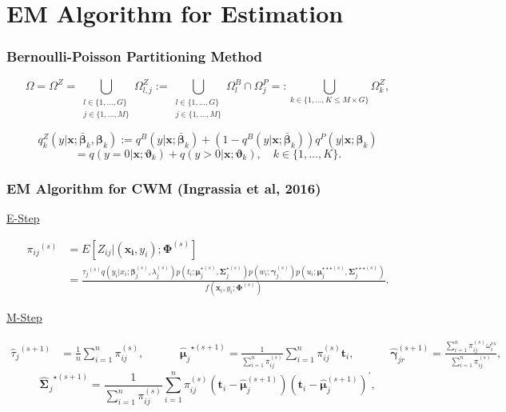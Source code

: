 \documentclass{beamer}
\begin{document}
\section{EM Algorithm for Estimation}
\begin{frame}
\frametitle{Bernoulli-Poisson Partitioning Method}
$$\Omega =  \Omega^Z = \bigcup_{ \substack {l \in \{1 ,\ldots, G \} \\ j \in \{1 ,\ldots, M \}}  } \Omega_{l,j}^Z := \bigcup_{\substack{ l \in \{1 ,\ldots, G \} \\ j \in \{1 ,\ldots, M \}  } }  \Omega_l^B \cap \Omega_j^P =: \bigcup_{k \in \{1 ,\ldots, K\leq M \times G \}} \Omega_k^Z, $$
\begin{small}
$$q^Z_{k}(y|\bm{x};  \bm{\bar{\beta}}_k,\bm{ \beta}_k)  := q^B(y|\bm{x}; \bm{\bar{\beta}}_k) +(1-  q^B(y|\bm{x}; \bm{\bar{\beta}}_k) ) q^P(y|\bm{x};\bm{\beta}_k) $$
 $$ = q(y = 0|\bm{x};\bm{\vartheta}_{k} ) +  q(y > 0|\bm{x} ; \bm{\vartheta}_{k}), \quad k \in \{1 ,\ldots, K \}. $$
 
\end{small}
\end{frame}
\begin{frame}
\frametitle{EM  Algorithm for CWM (Ingrassia et al, 2016)}
\underline{E-Step}
\begin{tiny}
\begin{equation*}\begin{split}
    {\pi_{ij}}^{(s)} &= {E}[Z_{ij} |(\bm{x_i}, y_i); \bm{\Phi}^{(s)}]\\
     &= \frac{{\tau_j}^{(s)}q(y_i|x_i; \bm \beta_j^{(s)}, \lambda^{(s)}_{j})p(t_i; \bm\mu_j^{{\star}(s)}, \bm\Sigma_j^{{\star}(s)}) p(w_i; \bm \gamma_j^{(s)})p(u_i; \bm{\mu}_j^{\star\star\star (s)},\bm{\Sigma}_j^{\star\star\star (s)})}{f(\bm{x}_i, y_i; \bm{\Phi}^{(s)})
\label{eq29}                       }.
\end{split}\end{equation*}
\end{tiny}
\underline{M-Step}
\begin{tiny}
\begin{align*}
{\hat{\tau}_j}^{(s+1)}&=\frac{1}{n} \sum_{i=1}^n \pi_{ij}^{(s)}, && && {\hat{\bm{\mu}}_j}^{\star (s+1)}=\frac{1}{\sum_{i=1}^n \pi_{ij}^{(s)}} \sum_{i=1}^n \pi_{ij}^{(s)}\bm t_i, &&  && {\hat{\bm \gamma}^{(s+1)}_{jr}} =\frac{\sum_{i=1}^n \pi_{ij}^{(s)} \omega^{rs}_i} {\sum_{i=1}^n \pi_{ij}^{(s)}},
\end{align*}
$$
 {\widehat{\bm \Sigma^{}}_j}^{\star(s+1)}=\frac{1}{\sum_{i=1}^n \pi_{ij}^{(s)}} \sum_{i=1}^n \pi_{ij}^{(s)}(\bm t_i-\hat{\bm \mu}^{(s+1)}_j) (\bm t_i-\hat{\bm \mu}^{(s+1)}_j)^{'}  ,
$$
\end{tiny}
\end{frame}
\end{document}

